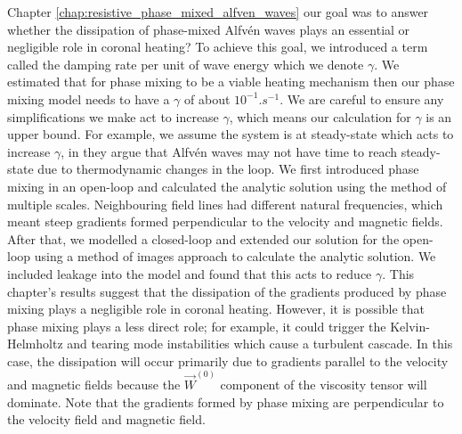 Chapter \ref{chap:resistive_phase_mixed_alfven_waves} our goal was to answer whether the dissipation of phase-mixed Alfv\'en waves plays an essential or negligible role in coronal heating? To achieve this goal, we introduced a term called the damping rate per unit of wave energy which we denote $\gamma$. We estimated that for phase mixing to be a viable heating mechanism then our phase mixing model needs to have a $\gamma$ of about $10^{-1}\si{.s^{-1}}$. We are careful to ensure any simplifications we make act to increase $\gamma$, which means our calculation for $\gamma$ is an upper bound. For example, we assume the system is at steady-state which acts to increase $\gamma$, in \citet{Arregui2015} they argue that Alfv\'en waves may not have time to reach steady-state due to thermodynamic changes in the loop. We first introduced phase mixing in an open-loop and calculated the analytic solution using the method of multiple scales. Neighbouring field lines had different natural frequencies, which meant steep gradients formed perpendicular to the velocity and magnetic fields. After that, we modelled a closed-loop and extended our solution for the open-loop using a method of images approach to calculate the analytic solution. We included leakage into the model and found that this acts to reduce $\gamma$. This chapter's results suggest that the dissipation of the gradients produced by phase mixing plays a negligible role in coronal heating. However, it is possible that phase mixing plays a less direct role; for example, it could trigger the Kelvin-Helmholtz and tearing mode instabilities which cause a turbulent cascade. In this case, the dissipation will occur primarily due to gradients parallel to the velocity and magnetic fields because the $\vec{W}^{(0)}$ component of the viscosity tensor will dominate. Note that the gradients formed by phase mixing are perpendicular to the velocity field and magnetic field.

